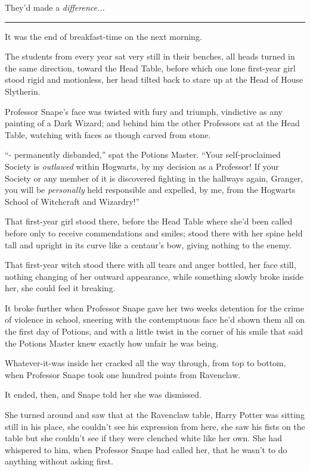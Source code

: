 They'd made a \emph{difference...}

\begin{center}\rule{3in}{0.4pt}\end{center}

It was the end of breakfast-time on the next morning.

The students from every year sat very still in their benches, all heads turned in the same direction, toward the Head Table, before which one lone first-year girl stood rigid and motionless, her head tilted back to stare up at the Head of House Slytherin.

Professor Snape's face was twisted with fury and triumph, vindictive as any painting of a Dark Wizard; and behind him the other Professors sat at the Head Table, watching with faces as though carved from stone.

``- permanently disbanded,'' spat the Potions Master. ``Your self-proclaimed Society is \emph{outlawed} within Hogwarts, by my decision as a Professor! If your Society or any member of it is discovered fighting in the hallways again, Granger, you will be \emph{personally} held responsible and expelled, by me, from the Hogwarts School of Witchcraft and Wizardry!''

That first-year girl stood there, before the Head Table where she'd been called before only to receive commendations and smiles; stood there with her spine held tall and upright in its curve like a centaur's bow, giving nothing to the enemy.

That first-year witch stood there with all tears and anger bottled, her face still, nothing changing of her outward appearance, while something slowly broke inside her, she could feel it breaking.

It broke further when Professor Snape gave her two weeks detention for the crime of violence in school, sneering with the contemptuous face he'd shown them all on the first day of Potions, and with a little twist in the corner of his smile that said the Potions Master knew exactly how unfair he was being.

Whatever-it-was inside her cracked all the way through, from top to bottom, when Professor Snape took one hundred points from Ravenclaw.

It ended, then, and Snape told her she was dismissed.

She turned around and saw that at the Ravenclaw table, Harry Potter was sitting still in his place, she couldn't see his expression from here, she saw his fists on the table but she couldn't see if they were clenched white like her own. She had whispered to him, when Professor Snape had called her, that he wasn't to do anything without asking first.

